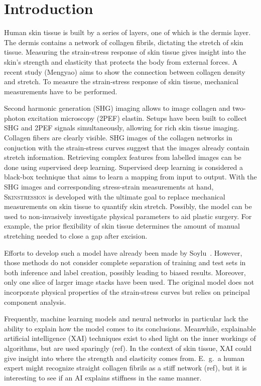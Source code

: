 \chapter{Introduction}

Human skin tissue is built by a series of layers, one of which is the dermis layer.
The dermis contains a network of collagen fibrils, dictating the stretch of skin tissue.
Measuring the strain-stress response of skin tissue gives insight into the skin's strength and elasticity that protects the body from external forces.
A recent study (Mengyao) aims to show the connection between collagen density and stretch.
To measure the strain-stress response of skin tissue, mechanical measurements have to be performed.

Second harmonic generation (SHG) imaging allows to image collagen and two-photon excitation microscopy (2PEF) elastin.
Setups have been built to collect SHG and 2PEF signals simultaneously, allowing for rich skin tissue imaging.
Collagen fibers are clearly visible.
SHG images of the collagen networks in conjuction with the strain-stress curves suggest that the images already contain stretch information.
Retrieving complex features from labelled images can be done using supervised deep learning.
Supervised deep learning is considered a black-box technique that aims to learn a mapping from input to output.
With the SHG images and corresponding stress-strain measurements at hand, \textsc{Skinstression} is developed with the ultimate goal to replace mechanical measurements on skin tissue to quantify skin stretch.
Possibly, the model can be used to non-invasively investigate physical parameters to aid plastic surgery.
For example, the prior flexibility of skin tissue determines the amount of manual stretching needed to close a gap after excision.

Efforts to develop such a model have already been made by Soylu~\cite{Soylu2022}.
However, those methods do not consider complete separation of training and test sets in both inference and label creation, possibly leading to biased results.
Moreover, only one slice of larger image stacks have been used.
The original model does not incorporate physical properties of the strain-stress curves but relies on principal component analysis.

Frequently, machine learning models and neural networks in particular lack the ability to explain how the model comes to its conclusions.
Meanwhile, explainable artificial intelligence (XAI) techniques exist to shed light on the inner workings of algorithms, but are used sparingly (ref).
In the context of skin tissue, XAI could give insight into where the strength and elasticity comes from.
E.\ g.\ a human expert might recognize straight collagen fibrils as a stiff network (ref), but it is interesting to see if an AI explains stiffness in the same manner.

